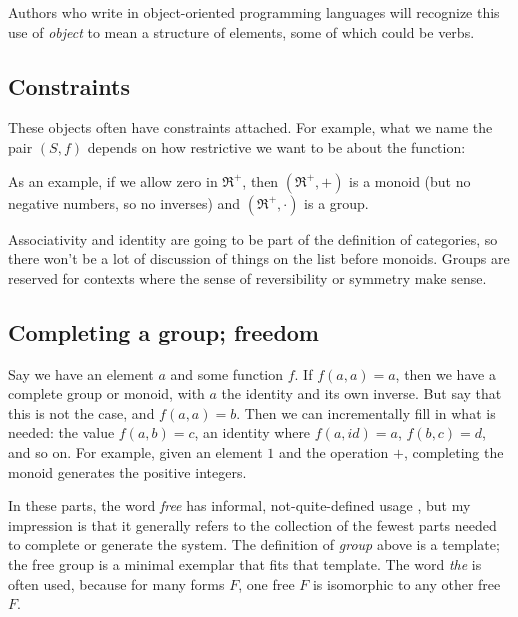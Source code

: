 \documentclass[11pt]{article}
\begin{document}
Authors who write in object-oriented programming languages will recognize this
use of {\em object} to mean a structure of elements, some of which could be verbs.

\subsection{Constraints}
These objects often have constraints attached. For example, what we name the pair $(S, f)$ depends on
how restrictive we want to be about the function:


As an example, if we allow zero in $\Re^+$, then $(\Re^+, +)$ is a monoid (but no
negative numbers, so no inverses) and $(\Re^+, \cdot)$ is a group.

Associativity and identity are going to be part of the definition of categories,
so there won't be a lot of discussion of things on the list before monoids.
Groups are reserved for contexts where the sense of reversibility or symmetry make sense.

\subsection{Completing a group; freedom} Say we have an element $a$ and some function $f$. If
$f(a,a)=a$, then we have a complete group or monoid, with $a$ the identity and its own
inverse.  But say that this is not the case, and $f(a,a)=b$. Then we can incrementally fill in what is
needed: the value $f(a,b)=c$, an identity where $f(a, id)=a$, $f(b,c)=d$, and so on. 
For example, given an element $1$ and the operation $+$, completing the monoid generates
the positive integers.

In these parts, the word {\em free} has informal, not-quite-defined usage
\citep{leinster:basic}, but my impression is that it generally refers to the collection
of the fewest parts needed to complete or generate the system.  The definition of
{\em group} above is a template; the free group is a minimal exemplar that fits that
template. The word {\em the} is often used, because for many forms $F$, one free $F$
is isomorphic to any other free $F$.
\end{document}
